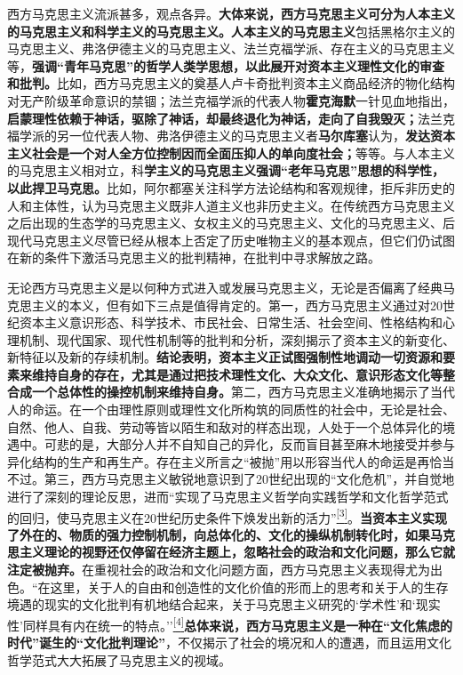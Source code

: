 \documentclass[UTF8, fontset = sourcesans, a4paper, oneside, zihao =
-4, scheme=chinese, no-math, space=true]{ctexbook}
\begin{document}
西方马克思主义流派甚多，观点各异。\textbf{大体来说，西方马克思主义可分为人本主义的马克思主义和科学主义的马克思主义。人本主义的马克思主义}包括黑格尔主义的马克思主义、弗洛伊德主义的马克思主义、法兰克福学派、存在主义的马克思主义等，\textbf{强调``青年马克思''的哲学人类学思想，以此展开对资本主义理性文化的审查和批判。}比如，西方马克思主义的奠基人卢卡奇批判资本主义商品经济的物化结构对无产阶级革命意识的禁锢；法兰克福学派的代表人物\textbf{霍克海默}一针见血地指出，\textbf{启蒙理性依赖于神话，驱除了神话，却最终退化为神话，走向了自我毁灭；}法兰克福学派的另一位代表人物、弗洛伊德主义的马克思主义者\textbf{马尔库塞}认为，\textbf{发达资本主义社会是一个对人全方位控制因而全面压抑人的单向度社会；}等等。与人本主义的马克思主义相对立，科\textbf{学主义的马克思主义强调``老年马克思''思想的科学性，以此捍卫马克思。}比如，阿尔都塞关注科学方法论结构和客观规律，拒斥非历史的人和主体性，认为马克思主义既非人道主义也非历史主义。在传统西方马克思主义之后出现的生态学的马克思主义、女权主义的马克思主义、文化的马克思主义、后现代马克思主义尽管已经从根本上否定了历史唯物主义的基本观点，但它们仍试图在新的条件下激活马克思主义的批判精神，在批判中寻求解放之路。

无论西方马克思主义是以何种方式进入或发展马克思主义，无论是否偏离了经典马克思主义的本义，但有如下三点是值得肯定的。第一，西方马克思主义通过对20世纪资本主义意识形态、科学技术、市民社会、日常生活、社会空间、性格结构和心理机制、现代国家、现代性机制等的批判和分析，深刻揭示了资本主义的新变化、新特征以及新的存续机制。\textbf{结论表明，资本主义正试图强制性地调动一切资源和要素来维持自身的存在，尤其是通过把技术理性文化、大众文化、意识形态文化等整合成一个总体性的操控机制来维持自身。}第二，西方马克思主义准确地揭示了当代人的命运。在一个由理性原则或理性文化所构筑的同质性的社会中，无论是社会、自然、他人、自我、劳动等皆以陌生和敌对的样态出现，人处于一个总体异化的境遇中。可悲的是，大部分人并不自知自己的异化，反而盲目甚至麻木地接受并参与异化结构的生产和再生产。存在主义所言之``被抛''用以形容当代人的命运是再恰当不过。第三，西方马克思主义敏锐地意识到了20世纪出现的``文化危机''，并自觉地进行了深刻的理论反思，进而``实现了马克思主义哲学向实践哲学和文化哲学范式的回归，使马克思主义在20世纪历史条件下焕发出新的活力''\protect\hypertarget{part0004.htmlux5cux23w3}{}{}\protect\hyperlink{part0004.htmlux5cux23m3}{\textsuperscript{{[}3{]}}}。\textbf{当资本主义实现了外在的、物质的强力控制机制，向总体化的、文化的操纵机制转化时，如果马克思主义理论的视野还仅停留在经济主题上，忽略社会的政治和文化问题，那么它就注定被抛弃。}在重视社会的政治和文化问题方面，西方马克思主义表现得尤为出色。``在这里，关于人的自由和创造性的文化价值的形而上的思考和关于人的生存境遇的现实的文化批判有机地结合起来，关于马克思主义研究的`学术性'和`现实性'同样具有内在统一的特点。''\protect\hypertarget{part0004.htmlux5cux23w4}{}{}\protect\hyperlink{part0004.htmlux5cux23m4}{\textsuperscript{{[}4{]}}}\textbf{总体来说，西方马克思主义是一种在``文化焦虑的时代''诞生的``文化批判理论''}，不仅揭示了社会的境况和人的遭遇，而且运用文化哲学范式大大拓展了马克思主义的视域。
\end{document}
